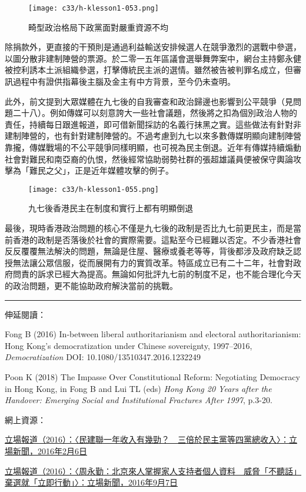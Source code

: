 \begin{figure}[htbp]
    \centering
    \texttt{[image: c33/h-klesson1-053.png]}
    \caption{畸型政治格局下政黨面對嚴重資源不均} 
\end{figure}

除捐款外，更直接的干預則是通過利益輸送安排候選人在競爭激烈的選戰中參選，以圖分散非建制陣營的票源。於二零一五年區議會選舉舞弊案中，網台主持鄭永健被控利誘本土派組織參選，打擊傳統民主派的選情。雖然被告被判罪名成立，但審訊過程中有證供指幕後主腦及金主有中方背景，至今仍未查明。

此外，前文提到大眾媒體在九七後的自我審查和政治歸邊也影響到公平競爭（見問題二十八）。例如傳媒可以刻意誇大一些社會議題，然後將之扣為個別政治人物的責任，持續每日跟進報道，即可借新聞採訪的名義行抹黑之實。這些做法有針對非建制陣營的，也有針對建制陣營的。不過考慮到九七以來多數傳媒明顯向建制陣營靠攏，傳媒戰場的不公平競爭同樣明顯，也可視為民主倒退。近年有傳媒持續煽動社會對難民和南亞裔的仇恨，然後經常協助弱勢社群的張超雄議員便被保守輿論攻擊為「難民之父」，正是近年媒體攻擊的例子。

\begin{figure}[htbp]
    \centering
    \texttt{[image: c33/h-klesson1-055.png]}
    \caption{九七後香港民主在制度和實行上都有明顯倒退} 
\end{figure}

最後，現時香港政治問題的核心不僅是九七後的政制是否比九七前更民主，而是當前香港的政制是否落後於社會的實際需要。這點至今已經難以否定。不少香港社會反反覆覆無法解決的問題，無論是住屋、醫療或養老等等，背後都涉及政府缺乏認授無法讓公眾信服，從而展開有力的實質改革。特區成立已有二十二年，社會對政府問責的訴求已經大為提高。無論如何批評九七前的制度不足，也不能合理化今天的政治問題，更不能協助政府解決當前的挑戰。

\rule[-10pt]{15cm}{0.05em}

伸延閱讀：

Fong B (2016) In-between liberal authoritarianism and electoral authoritarianism: Hong Kong’s democratization under Chinese sovereignty, 1997–2016, \textit{Democratization} DOI: 10.1080/13510347.2016.1232249

Poon K (2018) The Impasse Over Constitutional Reform: Negotiating Democracy in Hong Kong, in Fong B and Lui TL (eds) \textit{Hong Kong 20 Years after the Handover: Emerging Social and Institutional Fractures After 1997}, p.3-20.

網上資源：

\href{https://thestandnews.com/politics/政黨財力比恲-民建聯一年收入有幾勁-三倍於民主黨等四黨總收入/}{立場報道（2016）：〈民建聯一年收入有幾勁？　三倍於民主黨等四黨總收入〉：立場新聞，2016年2月6日}

\href{https://www.thestandnews.com/politics/周永勤-北京來人說出多名支持者個人資料-威脅-不聽話-棄選就-立即行動/}{立場報道（2016）：〈周永勤：北京來人掌握家人支持者個人資料　威脅「不聽話」棄選就「立即行動」〉：立場新聞，2016年9月7日}